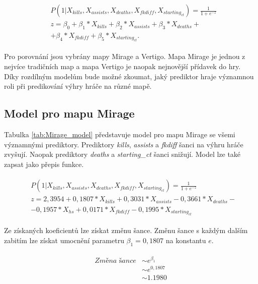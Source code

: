\begin{align*}
    \begin{split}
        &P(1 | X_{kills}, X_{assists}, X_{deaths}, X_{fkdiff}, X_{starting_{ct}}) = \frac{1}{1 + e^{-z}} \\
        &z = \beta_0 + \beta_1*X_{kills} + \beta_2*X_{assists} + \beta_3*X_{deaths} + \\
        &+ \beta_4*X_{fkdiff} + \beta_5*X_{starting_{ct}}.
    \end{split}
\end{align*}

Pro porovnání jsou vybrány mapy Mirage a Vertigo. Mapa Mirage je jednou z nejvíce tradičních map a mapa Vertigo je naopak nejnovější přídavek do hry.
Díky rozdílným modelům bude možné zkoumat, jaký prediktor hraje významnou roli při predikování výhry hráče na různé mapě.

\subsection{Model pro mapu Mirage}



Tabulka \ref{tab:Mirage_model} představuje model pro mapu Mirage se všemi významnými prediktory. Prediktory \textit{kills}, \textit{assists} a \textit{fkdiff} šanci na výhru
hráče zvyšují. Naopak prediktory \textit{deaths} a \textit{starting\_ct} šanci snižují. Model lze také zapsat jako přepis funkce.

\begin{align}
    \begin{split}
        &P(1 | X_{kills}, X_{assists}, X_{deaths}, X_{fkdiff}, X_{starting_{ct}}) = \frac{1}{1 + e^{-z}} \\
        &z = 2,3954 + 0,1807*X_{kills} + 0,3031*X_{assists} - 0,3661*X_{deaths} - \\
        &- 0,1957*X_{hs} + 0,0171*X_{fkdiff} - 0,1995*X_{starting_{ct}}
    \end{split}
\end{align}

Ze získaných koeficientů lze získat změnu šance. Změnu šance s každým dalším zabitím lze získat umocnění parametru $\beta_1 = 0,1807$ na konstantu $e$.

\begin{align}
    \begin{split}
        \textit{Změna šance} &\sim e^{\beta_1} \\
                             &\sim e^{0,1807} \\
                             &\sim 1.1980
    \end{split}
\end{align}

